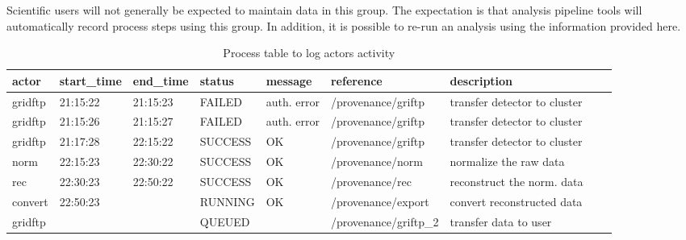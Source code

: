Scientific users will not generally be expected to maintain data in
this group. The expectation is that analysis pipeline tools will automatically
record process steps using this group. In addition, it is possible to re-run
an analysis using the information provided here.

\begin{table}[h!]\sffamily \footnotesize
\caption{Process table to log actors activity}
\begin{tabular}{l l l l l l l l l }
\toprule
\bfseries actor & \bfseries start\_time & \bfseries end\_time  & \bfseries status & \bfseries message & \bfseries reference & \bfseries description \\

\midrule
gridftp &  21:15:22   & 21:15:23 & FAILED  & auth. error & /provenance/griftp & transfer detector to cluster \\
gridftp &  21:15:26   & 21:15:27 & FAILED  & auth. error & /provenance/griftp & transfer detector to cluster \\
gridftp &  21:17:28   & 22:15:22 & SUCCESS  & OK & /provenance/griftp & transfer detector to cluster \\
norm &  22:15:23   & 22:30:22 & SUCCESS  & OK & /provenance/norm & normalize the raw data \\
rec &  22:30:23   & 22:50:22 & SUCCESS  & OK & /provenance/rec & reconstruct the norm. data \\
convert &  22:50:23   &  & RUNNING  & OK & /provenance/export & convert reconstructed data \\
gridftp &     &  & QUEUED  &  & /provenance/griftp\_2 & transfer data to user \\
\midrule
\bottomrule
\end{tabular}
\label{table:provenance}
\end{table}

